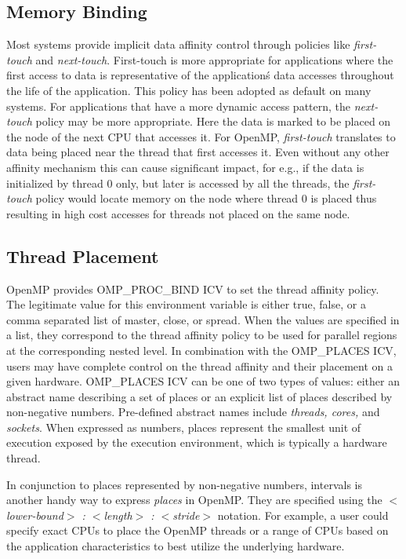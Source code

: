 \subsection{Memory Binding}
Most systems provide implicit data affinity control through policies like \textit{first-touch} 
and \textit{next-touch}. First-touch is more appropriate for applications where the 
first access to data is representative of the application\'s data accesses throughout 
the life of the application. This policy has been adopted as default on many systems. 
For applications that have a more dynamic access pattern, the \textit{next-touch} 
policy may be more appropriate. Here the data is marked to be placed on the node of the 
next CPU that accesses it. For OpenMP, \textit{first-touch} translates to data being 
placed near the thread that first accesses it. Even without any other affinity mechanism this 
can cause significant impact, for e.g., if the data is initialized by thread 0 only, but later is accessed 
by all the threads, the \textit{first-touch} policy would locate memory on the node where 
thread 0 is placed thus resulting in high cost accesses for threads not placed on the same node. 

\subsection{Thread Placement}
OpenMP provides OMP\_PROC\_BIND ICV to set the thread affinity policy. The legitimate value for 
this environment variable is either true, false, or a comma separated list of master, close, or spread. 
When the values are specified in a list, they correspond to the thread affinity policy to be used for 
parallel regions at the corresponding nested level. In combination with the OMP\_PLACES ICV, 
users may have complete control on the thread affinity and their placement on a given hardware. 
OMP\_PLACES ICV can be one of two types of values: either an abstract name describing a set 
of places or an explicit list of places described by non-negative numbers. Pre-defined abstract 
names include \textit{threads, cores,} and \textit{sockets}. When expressed as numbers, places 
represent the smallest unit of execution exposed by the execution environment, which is typically 
a hardware thread.

In conjunction to places represented by non-negative numbers, intervals is another handy way to 
express \textit{places} in OpenMP. They are specified using the \textit{$<$lower-bound$>$ : $<$length$>$ : $<$stride$>$} notation. For example, a user could specify exact CPUs to place the OpenMP threads or a range of CPUs based on the application characteristics to best utilize the underlying hardware.

